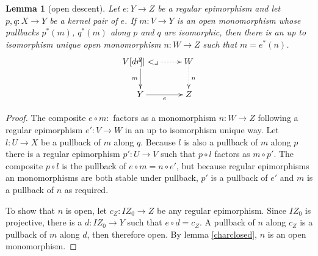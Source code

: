 \documentclass[sort&compress]{elsarticle}
\theoremstyle{plain}
\newtheorem{lemma}[theorem]{Lemma}
\theoremstyle{definition}
\theoremstyle{remark}
\newcommand\hide[1]{}
\begin{document}
\begin{lemma}[open descent] Let $e:Y\to Z$ be a regular epimorphism and let $p,q:X\to Y$ be a kernel pair of $e$. If $m:V\to Y$ is an open monomorphism whose pullbacks $p^*(m)$, $q^*(m)$ along $p$ and $q$ are isomorphic, then there is an up to isomorphism unique open monomorphism $n:W\to Z$ such that $m = e^*(n)$.
\[ \xymatrix{
 V \ar@{.>}[r]\ar[d]_m\pb & W\ar@{.>}[d]^n\\
 Y \ar[r]_e & Z
}\]\label{opendescent}
\end{lemma}

\begin{proof} The composite $e\circ m:$ factors as a monomorphism $n:W\to Z$ following a regular epimorphism $e':V\to W$ in an up to isomorphism unique way. Let $l:U\to X$ be a pullback of $m$ along $q$. Because $l$ is also a pullback of $m$ along $p$ there is a regular epimorphism $p':U\to V$ such that $p\circ l$ factors as $m\circ p'$. The composite $p\circ l$ is the pullback of $e\circ m = n\circ e'$, but because regular epimorphisms an monomorphisms are both stable under pullback, $p'$ is a pullback of $e'$ and $m$ is a pullback of $n$ as required. 

To show that $n$ is open, let $c_Z:IZ_0 \to Z$ be any regular epimorphism. Since $IZ_0$ is projective, there is a $d:IZ_0 \to Y$ such that $e\circ d = c_Z$. A pullback of $n$ along $c_Z$ is a pullback of $m$ along $d$, then therefore open. By lemma \ref{charclosed}, $n$ is an open monomorphism.
\end{proof}


\hide{Vanaf hier komen subobjecten e.d. weer terug. Verderop gebruik ik lokale kleinheid. Daar komen de problemen vandaan.

Misschien kunnen we onderstaande definitie helemaal vermijden.

Herformuleer wat we willen bewijzen? Er is een subobject classfier: generiek monomorfisme waarvoor de pullbakcs uniek zijn.
}

\end{document}

